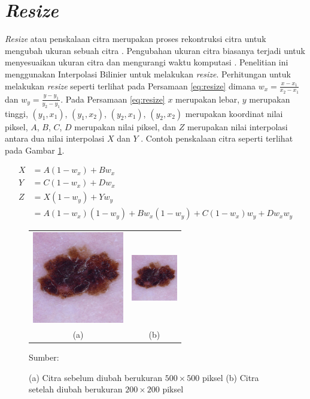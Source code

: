 \section{\textit{Resize}}
\textit{Resize} atau penskalaan citra merupakan proses rekontruksi citra untuk mengubah ukuran sebuah citra \citep{Morsy2018}. Pengubahan ukuran citra biasanya terjadi untuk menyesuaikan ukuran citra dan mengurangi waktu komputasi \citep{AhmedThaajwer2020a,Umamaheswari2018}. Penelitian ini menggunakan Interpolasi Bilinier untuk melakukan \textit{resize}. Perhitungan untuk melakukan \textit{resize} seperti terlihat pada Persamaan \ref{eq:resize} dimana $w_x = \frac{x-x_1}{x_2-x_1}$ dan $w_y = \frac{y-y_1}{y_2-y_1}$. Pada Persamaan \ref{eq:resize} $x$ merupakan lebar, $y$ merupakan tinggi, $(y_1, x_1)$, $(y_1, x_2)$, $(y_2, x_1)$, $(y_2, x_2)$ merupakan koordinat nilai piksel, $A$, $B$, $C$, $D$ merupakan nilai piksel, dan $Z$ merupakan nilai interpolasi antara dua nilai interpolasi $X$ dan $Y$ \citep{Gribbon2004}. Contoh penskalaan citra seperti terlihat pada Gambar \ref{fig:resize}.

\begin{align}
    X &= A(1-w_x)+Bw_x\nonumber\\
    Y &= C(1-w_x)+Dw_x\nonumber\\
    Z &= X(1-w_y)+Yw_y\nonumber\\
    \label{eq:resize}
    &= A(1-w_x)(1-w_y) + Bw_x(1-w_y) + C(1-w_x)w_y + Dw_{x}w_{y}
\end{align}

\begin{figure}[H]
    \centering
    \begin{tabular}{cc}
        \includegraphics[width=4cm]{img/bab2/mel.jpg}
        &
        \includegraphics[width=2cm]{img/bab2/mel.jpg}\\
        (a) &(b)\\
    \end{tabular}
    \caption{(a) Citra sebelum diubah berukuran $500\times 500$ piksel (b) Citra setelah diubah berukuran $200\times 200$ piksel}
    \label{fig:resize}
    Sumber: \citep{Morsy2018}
\end{figure}


